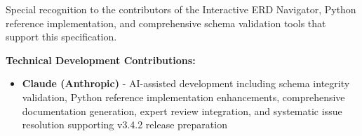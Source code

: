 \documentclass{article}
\begin{document}
Special recognition to the contributors of the Interactive ERD Navigator, Python reference implementation, and comprehensive schema validation tools that support this specification.

\textbf{Technical Development Contributions:}
\begin{itemize}
    \item \textbf{Claude (Anthropic)} - AI-assisted development including schema integrity validation, Python reference implementation enhancements, comprehensive documentation generation, expert review integration, and systematic issue resolution supporting v3.4.2 release preparation
\end{itemize}

\newpage
\printindex
\end{document}
